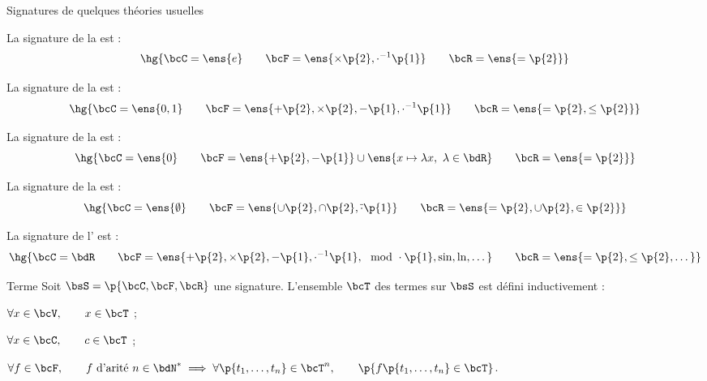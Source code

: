     \begin{example}{Signatures de quelques théories usuelles}{}
        \begin{enumerate}
            \itt La signature de la  est :
            \[ \hg{\bcC = \ens{e} \qquad \bcF = \ens{ \times \p{2}, \cdot^{-1} \p{1}} \qquad \bcR = \ens{= \p{2}}}\]
            
            \itt La signature de la  est :
            \[ \hg{\bcC = \ens{0, 1} \qquad \bcF = \ens{ + \p{2}, \times \p{2}, - \p{1}, \cdot^{-1} \p{1}} \qquad \bcR = \ens{= \p{2}, \leq \p{2}}}\]
            
            \itt La signature de la  est :
            \[ \hg{\bcC = \ens{0} \qquad \bcF = \ens{ + \p{2}, - \p{1}} \cup \ens{x \mapsto \lambda x ,\ \lambda \in \bdR} \qquad \bcR = \ens{= \p{2}}}\]
            
            \itt La signature de la  est :
            \[ \hg{\bcC = \ens{\emptyset} \qquad \bcF = \ens{ \cup \p{2}, \cap \p{2}, \overline{\cdot} \p{1}} \qquad \bcR = \ens{= \p{2}, \cup \p{2}, \in \p{2}}}\]
            
            \itt La signature de l' est :
            \[ \hg{\bcC = \bdR \qquad \bcF = \ens{ + \p{2}, \times \p{2}, - \p{1}, \cdot^{-1} \p{1}, \mod{\cdot} \p{1}, \sin, \ln, \dots} \qquad \bcR = \ens{= \p{2}, \leq \p{2}, \dots}}\]
        \end{enumerate}
        
    \end{example}
    
    \begin{definition}{Terme}{}
        Soit $\bsS = \p{\bcC, \bcF, \bcR}$ une signature. L'ensemble $\bcT$ des termes sur $\bsS$ est défini inductivement :
        
        \begin{enumerate}
            \itast $\forall x \in \bcV,\qquad x \in \bcT$ ;
            
            \itast $\forall x \in \bcC,\qquad c \in \bcT$ ;
            
            \itast $\forall f \in \bcF,\qquad f \ \text{d'arité} \ n \in \bdN^* \implies \forall \p{t_1, \dots, t_n} \in \bcT^n,\qquad \p{f\p{t_1, \dots, t_n} \in \bcT}$.
        \end{enumerate}
    \end{definition}
    
